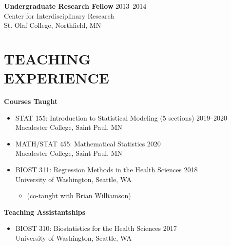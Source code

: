 \documentclass[margin]{res}
\begin{document}
\begin{resume}
\textbf{Undergraduate Research Fellow} \hfill 2013--2014 \\
Center for Interdisciplinary Research \\
St. Olaf College, Northfield, MN \\

\section{TEACHING \\ EXPERIENCE}

\textbf{Courses Taught} \vspace{0.1cm}
\begin{itemize}
\item STAT 155: Introduction to Statistical Modeling (5 sections) \hfill 2019--2020 \\
Macalester College, Saint Paul, MN

\item MATH/STAT 455: Mathematical Statistics \hfill 2020 \\
Macalester College, Saint Paul, MN

\item BIOST 311: Regression Methods in the Health Sciences \hfill  2018 \\
University of Washington, Seattle, WA \vspace{-0.2cm}
\begin{itemize} 
				\item[] (co-taught with Brian Williamson)
				\end{itemize}
\end{itemize} 

\newpage

\textbf{Teaching Assistantships} 
\begin{itemize}
\item BIOST 310: Biostatistics for the Health Sciences  \hfill  2017 \\
University of Washington, Seattle, WA \vspace{0.1cm}


\end{itemize}
\end{resume}
\end{document}
